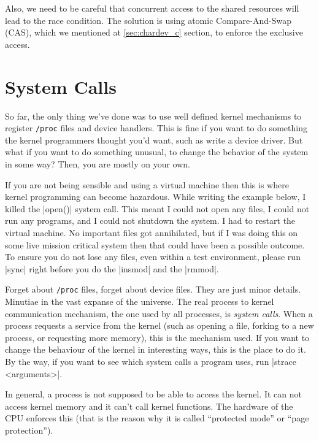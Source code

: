 \documentclass[10pt, oneside]{book}
\begin{document}
Also, we need to be careful that concurrent access to the shared resources will lead to the race condition.
The solution is using atomic Compare-And-Swap (CAS), which we mentioned at \ref{sec:chardev_c} section, to enforce the exclusive access.




\section{System Calls}
\label{sec:syscall}
So far, the only thing we've done was to use well defined kernel mechanisms to register \verb|/proc| files and device handlers.
This is fine if you want to do something the kernel programmers thought you'd want, such as write a device driver.
But what if you want to do something unusual, to change the behavior of the system in some way?
Then, you are mostly on your own.

If you are not being sensible and using a virtual machine then this is where kernel programming can become hazardous.
While writing the example below, I killed the \cpp|open()| system call.
This meant I could not open any files, I could not run any programs, and I could not shutdown the system.
I had to restart the virtual machine.
No important files got annihilated, but if I was doing this on some live mission critical system then that could have been a possible outcome.
To ensure you do not lose any files, even within a test environment, please run \sh|sync| right before you do the \sh|insmod| and the \sh|rmmod|.

Forget about \verb|/proc| files, forget about device files.
They are just minor details.
Minutiae in the vast expanse of the universe.
The real process to kernel communication mechanism, the one used by all processes, is \emph{system calls}.
When a process requests a service from the kernel (such as opening a file, forking to a new process, or requesting more memory), this is the mechanism used.
If you want to change the behaviour of the kernel in interesting ways, this is the place to do it.
By the way, if you want to see which system calls a program uses, run \sh|strace <arguments>|.

In general, a process is not supposed to be able to access the kernel.
It can not access kernel memory and it can't call kernel functions.
The hardware of the CPU enforces this (that is the reason why it is called ``protected mode'' or ``page protection'').
\end{document}
